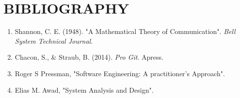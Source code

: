 \documentclass[12pt, a4paper, oneside]{report}
\begin{document}
\chapter*{BIBLIOGRAPHY}
\begin{enumerate}
    \item Shannon, C. E. (1948). "A Mathematical Theory of Communication". \textit{Bell System Technical Journal}.
    \item Chacon, S., \& Straub, B. (2014). \textit{Pro Git}. Apress.
    \item Roger S Pressman, "Software Engineering: A practitioner's Approach".
    \item Elias M. Awad, "System Analysis and Design".
\end{enumerate}
\end{document}
